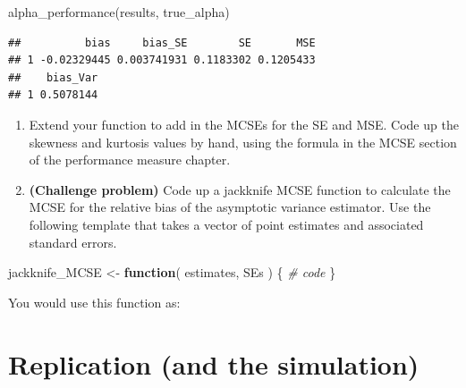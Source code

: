 \documentclass[
]{book}
\newenvironment{Shaded}{\begin{snugshade}}{\end{snugshade}}
\newcommand{\CommentTok}[1]{\textcolor[rgb]{0.56,0.35,0.01}{\textit{#1}}}
\newcommand{\ControlFlowTok}[1]{\textcolor[rgb]{0.13,0.29,0.53}{\textbf{#1}}}
\newcommand{\FunctionTok}[1]{\textcolor[rgb]{0.00,0.00,0.00}{#1}}
\newcommand{\NormalTok}[1]{#1}
\newcommand{\OtherTok}[1]{\textcolor[rgb]{0.56,0.35,0.01}{#1}}
\newcommand{\SpecialCharTok}[1]{\textcolor[rgb]{0.00,0.00,0.00}{#1}}
\begin{document}
\begin{Shaded}
\begin{Highlighting}[]
\FunctionTok{alpha\_performance}\NormalTok{(results, true\_alpha)}
\end{Highlighting}
\end{Shaded}

\begin{verbatim}
##          bias     bias_SE        SE       MSE
## 1 -0.02329445 0.003741931 0.1183302 0.1205433
##    bias_Var
## 1 0.5078144
\end{verbatim}

\begin{enumerate}
\def\labelenumi{\arabic{enumi}.}
\setcounter{enumi}{5}
\item
  Extend your function to add in the MCSEs for the SE and MSE. Code up the skewness and kurtosis values by hand, using the formula in the MCSE section of the performance measure chapter.
\item
  \textbf{(Challenge problem)} Code up a jackknife MCSE function to calculate the MCSE for the relative bias of the asymptotic variance estimator.
  Use the following template that takes a vector of point estimates and associated standard errors.
\end{enumerate}

\begin{Shaded}
\begin{Highlighting}[]
\NormalTok{jackknife\_MCSE }\OtherTok{\textless{}{-}} \ControlFlowTok{function}\NormalTok{( estimates, SEs ) \{}
  \CommentTok{\# code}
\NormalTok{\}}
\end{Highlighting}
\end{Shaded}

You would use this function as:

\begin{Shaded}
\end{Shaded}

\hypertarget{replication-and-the-simulation}{%
\section{Replication (and the simulation)}\label{replication-and-the-simulation}}
\end{document}

